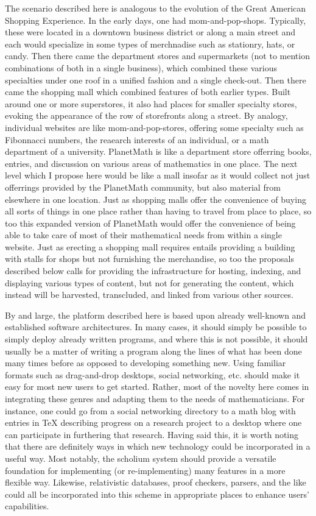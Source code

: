 The scenario described here is analogous to the evolution of the Great
American Shopping Experience. In the early days, one had
mom-and-pop-shops. Typically, these were located in a downtown business
district or along a main street and each would specialize in some types
of merchnadise such as stationry, hats, or candy. Then there came the
department stores and supermarkets (not to mention combinations of both
in a single business), which combined these various specialties under
one roof in a unified fashion and a single check-out. Then there came
the shopping mall which combined features of both earlier types. Built
around one or more superstores, it also had places for smaller specialty
stores, evoking the appearance of the row of storefronts along a street.
By analogy, individual websites are like mom-and-pop-stores, offering
some specialty such as Fibonnacci numbers, the reaearch interests of an
individual, or a math department of a university. PlanetMath is like a
department store offerring books, entries, and discussion on various
areas of mathematics in one place. The next level which I propose here
would be like a mall insofar as it would collect not just offerrings
provided by the PlanetMath community, but also material from elsewhere
in one location. Just as shopping malls offer the convenience of buying
all sorts of things in one place rather than having to travel from place
to place, so too this expanded version of PlanetMath would offer the
convenience of being able to take care of most of their mathematical
needs from within a single website. Just as erecting a shopping mall
requires entails providing a building with stalls for shops but not
furnishing the merchandise, so too the proposals described below calls
for providing the infrastructure for hosting, indexing, and displaying
various types of content, but not for generating the content, which
instead will be harvested, transcluded, and linked from various other
sources.

By and large, the platform described here is based upon already
well-known and established software architectures. In many cases, it
should simply be possible to simply deploy already written programs, and
where this is not possible, it should usually be a matter of writing a
program along the lines of what has been done many times before as
opposed to developing something new. Using familiar formats such as
drag-and-drop desktops, social networking, etc. should make it easy for
most new users to get started. Rather, most of the novelty here comes in
integrating these genres and adapting them to the needs of
mathematicians. For instance, one could go from a social networking
directory to a math blog with entries in TeX describing progress on a
research project to a desktop where one can participate in furthering
that research. Having said this, it is worth noting that there are
definitely ways in which new technology could be incorporated in a
useful way. Most notably, the scholium system should provide a versatile
foundation for implementing (or re-implementing) many features in a more
flexible way. Likewise, relativistic databases, proof checkers, parsers,
and the like could all be incorporated into this scheme in appropriate
places to enhance users' capabilities.

